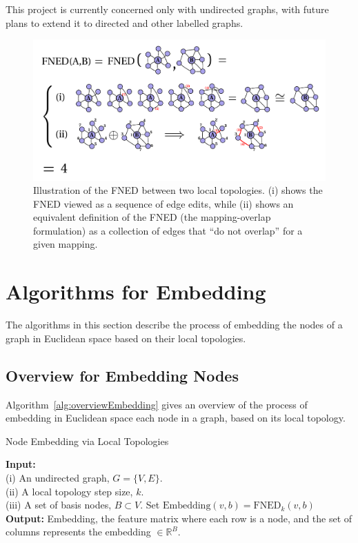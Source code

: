 \documentclass[10pt,twocolumn,fleqn]{article}
\begin{document}
This project is currently concerned only with undirected graphs, with future plans to extend it to directed and other labelled graphs. 


\begin{figure}[!]
  \centering               
  \includegraphics[width=1\textwidth]{../img/fnedRelated/fnedFigure.pdf}
  \caption{Illustration of the FNED between two local topologies. (i) shows the FNED viewed as a sequence of edge edits, while (ii) shows an equivalent definition of the FNED (the mapping-overlap formulation) as a collection of edges that ``do not overlap'' for a given mapping.}
  \label{fig:fnedFigure}
\end{figure}




\section{Algorithms for Embedding}
\label{sec:algos}
The algorithms in this section describe the process of embedding the nodes of a graph in Euclidean space based on their local topologies.



\subsection{Overview for Embedding Nodes}

Algorithm~\ref{alg:overviewEmbedding} gives an overview of the process of embedding in Euclidean space each node in a graph, based on its local topology.

\begin{algorithm}[!]
\caption{Node Embedding via Local Topologies}
\label{alg:overviewEmbedding}
\begin{algorithmic}[1]
\STATE \textbf{Input:} \\(i) An undirected graph, $G = \{V,E\}$.\\(ii) A local topology step size, $k$.\\(iii) A set of basis nodes, $B \subset V$.
\STATE Set $\text{Embedding}(v,b) = \text{FNED}_{k}(v,b)$
\ENDFOR
\ENDFOR
\STATE \textbf{Output:} Embedding, the feature matrix where each row is a node, and the set of columns represents the embedding $\in \mathbb{R}^{B}$.
\end{algorithmic}
\end{algorithm}
\end{document}
